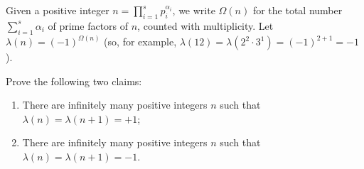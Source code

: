 Given a positive integer $\displaystyle n = \prod_{i=1}^s p_i^{\alpha_i}$, we write $\Omega(n)$ for the total number $\displaystyle \sum_{i=1}^s \alpha_i$ of prime factors of $n$, counted with multiplicity. Let $\lambda(n) = (-1)^{\Omega(n)}$ (so, for example, $\lambda(12)=\lambda(2^2\cdot3^1)=(-1)^{2+1}=-1$).

Prove the following two claims:
\begin{enumerate}[label=(\roman*)]
	\item There are infinitely many positive integers $n$ such that $\lambda(n) = \lambda(n+1) = +1$; 
	\item There are infinitely many positive integers $n$ such that $\lambda(n) = \lambda(n+1) = -1$.
\end{enumerate}
